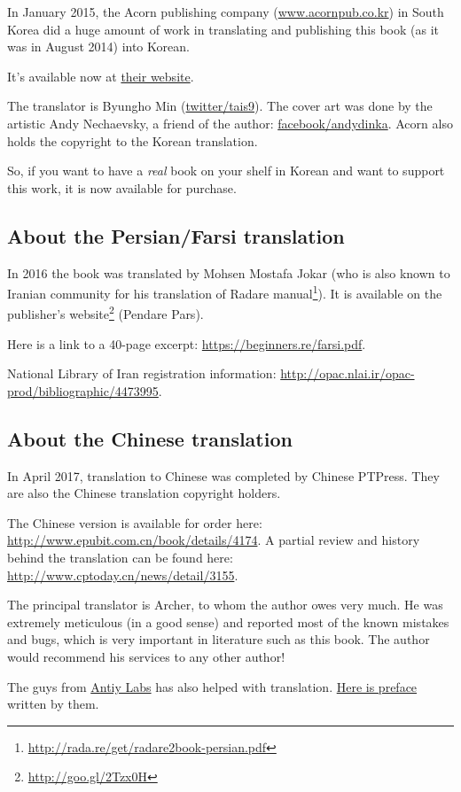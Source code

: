 In January 2015, the Acorn publishing company (\href{http://www.acornpub.co.kr}{www.acornpub.co.kr}) in South Korea did a huge amount of work in translating and publishing
this book (as it was in August 2014) into Korean.

It's available now at \href{http://go.yurichev.com/17343}{their website}.

The translator is Byungho Min (\href{http://go.yurichev.com/17344}{twitter/tais9}).
The cover art was done by the artistic Andy Nechaevsky, a friend of the author:
\href{http://go.yurichev.com/17023}{facebook/andydinka}.
Acorn also holds the copyright to the Korean translation.

So, if you want to have a \emph{real} book on your shelf in Korean and
want to support this work, it is now available for purchase.

\subsection*{About the Persian/Farsi translation}

In 2016 the book was translated by Mohsen Mostafa Jokar (who is also known to Iranian community for his translation of Radare manual\footnote{\url{http://rada.re/get/radare2book-persian.pdf}}).
It is available on the publisher’s website\footnote{\url{http://goo.gl/2Tzx0H}} (Pendare Pars).

Here is a link to a 40-page excerpt: \url{https://beginners.re/farsi.pdf}.

National Library of Iran registration information: \url{http://opac.nlai.ir/opac-prod/bibliographic/4473995}.

\subsection*{About the Chinese translation}

In April 2017, translation to Chinese was completed by Chinese PTPress. They are also the Chinese translation copyright holders.

 The Chinese version is available for order here: \url{http://www.epubit.com.cn/book/details/4174}. A partial review and history behind the translation can be found here: \url{http://www.cptoday.cn/news/detail/3155}.

The principal translator is Archer, to whom the author owes very much. He was extremely meticulous (in a good sense) and reported most of the known mistakes and bugs, which is very important in literature such as this book.
The author would recommend his services to any other author!

The guys from \href{http://www.antiy.net/}{Antiy Labs} has also helped with translation. \href{http://www.epubit.com.cn/book/onlinechapter/51413}{Here is preface} written by them.

